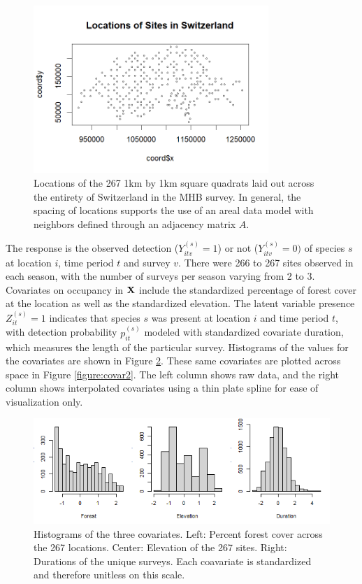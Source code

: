\begin{figure}[ht]
  \centering
  \includegraphics[width=3.5in,trim=.6cm 1.25cm .5cm .75cm, clip]{locations.png}  \caption{Locations of the 267 1km by 1km square quadrats laid out across the entirety of Switzerland in the MHB survey.  In general, the spacing of locations supports the use of an areal data model with neighbors defined through an adjacency matrix $A$.}
  \label{figure:locs}
\end{figure}

The response is the observed detection ($Y^{(s)}_{itv}=1$) or not ($Y^{(s)}_{itv}=0)$ of species $s$ at location $i$, time period $t$ and survey $v$. There were 266 to 267 sites observed in each season, with the number of surveys per season varying from 2 to 3.  Covariates on occupancy in ${\bf X}$ include the standardized percentage of forest cover at the location as well as the standardized elevation. The latent variable presence $Z^{(s)}_{it} = 1$ indicates that species $s$ was present at location $i$ and time period $t$, with detection probability $p^{(s)}_{it}$ modeled with standardized covariate duration, which measures the length of the particular survey.  Histograms of the values for the covariates are shown in Figure \ref{figure:covar}.  These same covariates are plotted across space in Figure \ref{figure:covar2}.  The left column shows raw data, and the right column shows interpolated covariates using a thin plate spline for ease of visualization only.

\begin{figure}[htbp]
  \centering
  \includegraphics[width=5.5in]{hist.png}
  \caption{Histograms of the three covariates.  Left: Percent forest cover across the 267 locations. Center: Elevation of the 267 sites. Right:  Durations of the unique surveys.  Each coavariate is standardized and therefore unitless on this scale.}
  \label{figure:covar}
\end{figure}

